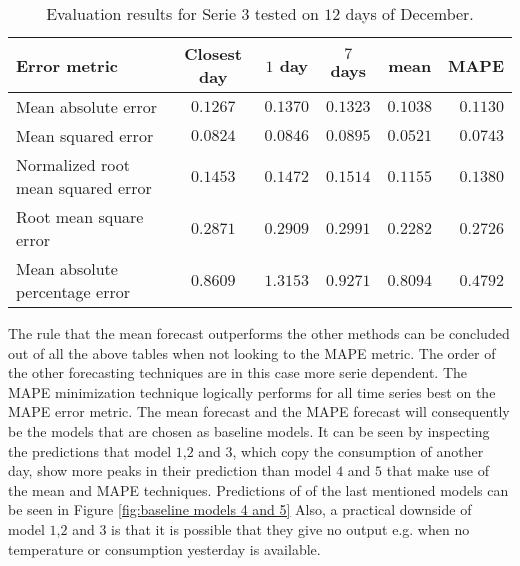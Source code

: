 \begin{table}[ht]
	\centering
	\begin{tabular}{@{}l|ccccr@{}} \toprule
		\textbf{Error metric}	& \textbf{Closest day} & \textbf{$ 1 $ day} & \textbf{$ 7 $ days} & \textbf{mean} & \textbf{MAPE}\\\midrule
		Mean absolute error& $0.1267 $&\cellcolor{red!25}$ 0.1370 $  & $0.1323 $ &\cellcolor{green!25} $ 0.1038 $ & $ 0.1130 $\\
		Mean squared error& $0.0824 $&$ 0.0846 $  & \cellcolor{red!25}$0.0895 $ & \cellcolor{green!25}$ 0.0521 $ & $ 0.0743 $\\
		Normalized root mean squared error& $0.1453 $&$ 0.1472$  & \cellcolor{red!25}$0.1514$ & \cellcolor{green!25}$ 0.1155$ & $ 0.1380$\\
		Root mean square error& $0.2871 $&$ 0.2909$  & \cellcolor{red!25}$0.2991$ & \cellcolor{green!25}$ 0.2282$ & $ 0.2726$\\
		Mean absolute percentage error & $ 0.8609 $&\cellcolor{red!25}$ 1.3153 $  & $ 0.9271 $ & $ 0.8094  $ &\cellcolor{green!25} $ 0.4792 $\\\bottomrule
	\end{tabular}
	\caption{Evaluation results for Serie $ 3 $ tested on $ 12 $ days of December.}
	\label{tab:summ_data_serie3}
\end{table}

The rule that the mean forecast outperforms the other methods can be concluded out of all the above tables when not looking to the MAPE metric. The order of the other forecasting techniques are in this case more serie dependent. The MAPE minimization technique logically performs for all time series best on the MAPE error metric. The mean forecast and the MAPE forecast will consequently be the models that are chosen as baseline models. It can be seen by inspecting the predictions that model $ 1 $,$ 2 $ and $ 3 $, which copy the consumption of another day, show more peaks in their prediction than model $ 4 $ and $ 5 $ that make use of the mean and MAPE techniques. Predictions of of the last mentioned models can be seen in Figure \ref{fig:baseline models 4 and 5} Also, a practical downside of model $ 1 $,$ 2 $ and $ 3 $ is that it is possible that they give no output e.g. when no temperature or consumption yesterday is available. \\

